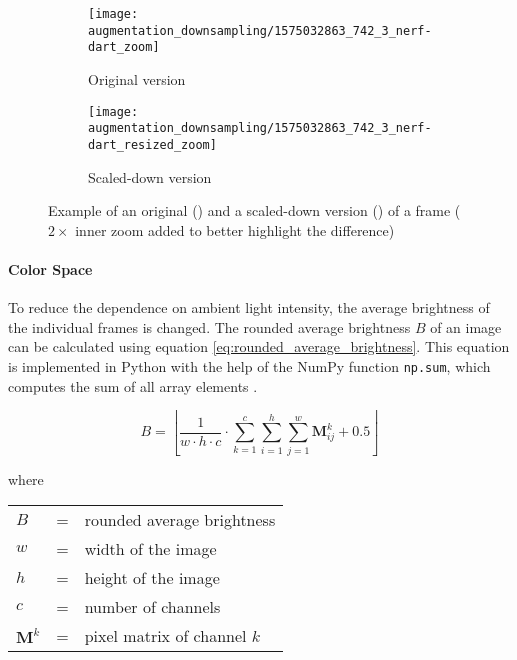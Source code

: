 \begin{figure}
  \centering
  \begin{subfigure}[b]{0.45\textwidth}
    \centering
    \texttt{[image: augmentation\_downsampling/1575032863\_742\_3\_nerf-dart\_zoom]}
    \caption{Original version}
    \label{subfig:ad_original}
  \end{subfigure}
  \begin{subfigure}[b]{0.45\textwidth}
    \centering
    \texttt{[image: augmentation\_downsampling/1575032863\_742\_3\_nerf-dart\_resized\_zoom]}
    \caption{Scaled-down version}
    \label{subfig:ad_resized}
  \end{subfigure}
  \caption{Example of an original () and a scaled-down version () of a frame ($2\times$ inner zoom added to better highlight the difference)}
  \label{fig:augmentation_downsampling}
\end{figure}

\paragraph{Color Space}
To reduce the dependence on ambient light intensity, the average brightness of the individual frames is changed.
The rounded average brightness $B$ of an image can be calculated using equation \ref{eq:rounded_average_brightness}.
This equation is implemented in Python with the help of the NumPy function \texttt{np.sum}, which computes the sum of all array elements \cite{training_numpy_sum}.

\begin{equation}
  B = \left\lfloor\frac{1}{w\cdot h\cdot c} \cdot \sum\limits_{k=1}^c \sum\limits_{i=1}^h \sum\limits_{j=1}^w \boldsymbol{M}_{ij}^{k} + 0.5\right\rfloor
  \label{eq:rounded_average_brightness}
\end{equation}

where

\begin{tabular}{lll}
  $B$ & = & rounded average brightness \\
  $w$ & = & width of the image \\
  $h$ & = & height of the image \\
  $c$ & = & number of channels \\
  $\boldsymbol{M}^k$ & = & pixel matrix of channel $k$ \\
\end{tabular}
\\


